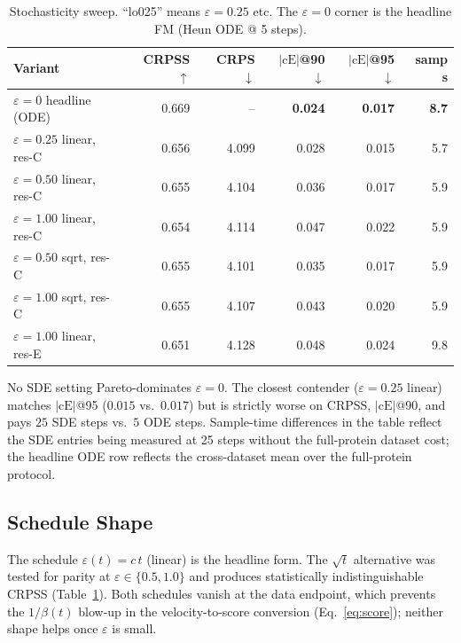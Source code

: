 \documentclass{uai2026}
\begin{document}
\begin{table}[!h]
  \centering
  \caption{Stochasticity sweep. ``lo025'' means $\varepsilon=0.25$ etc. The $\varepsilon=0$ corner is the headline FM (Heun ODE @ 5 steps).}\label{tab:stoch-eps}
  \footnotesize
  \begin{tabular}{lrrrrr}
    \toprule
    Variant & CRPSS $\uparrow$ & CRPS $\downarrow$ & $|\text{cE}|$@90 $\downarrow$ & $|\text{cE}|$@95 $\downarrow$ & samp s \\
    \midrule
    $\varepsilon=0$ headline (ODE)    & 0.669 & --     & \textbf{0.024} & \textbf{0.017} & \textbf{8.7} \\
    $\varepsilon=0.25$ linear, res-C  & 0.656 & 4.099  & 0.028 & 0.015 & 5.7 \\
    $\varepsilon=0.50$ linear, res-C  & 0.655 & 4.104  & 0.036 & 0.017 & 5.9 \\
    $\varepsilon=1.00$ linear, res-C  & 0.654 & 4.114  & 0.047 & 0.022 & 5.9 \\
    $\varepsilon=0.50$ sqrt, res-C    & 0.655 & 4.101  & 0.035 & 0.017 & 5.9 \\
    $\varepsilon=1.00$ sqrt, res-C    & 0.655 & 4.107  & 0.043 & 0.020 & 5.9 \\
    $\varepsilon=1.00$ linear, res-E  & 0.651 & 4.128  & 0.048 & 0.024 & 9.8 \\
    \bottomrule
  \end{tabular}
\end{table}

No SDE setting Pareto-dominates $\varepsilon=0$. The closest contender ($\varepsilon=0.25$ linear) matches $|\text{cE}|$@95 ($0.015$ vs.\ $0.017$) but is strictly worse on CRPSS, $|\text{cE}|$@90, and pays $25$ SDE steps vs.\ $5$ ODE steps. Sample-time differences in the table reflect the SDE entries being measured at 25 steps without the full-protein dataset cost; the headline ODE row reflects the cross-dataset mean over the full-protein protocol.

\subsection{Schedule Shape}\label{app:stoch-schedule}

The schedule $\varepsilon(t) = c\,t$ (linear) is the headline form. The $\sqrt{t}$ alternative was tested for parity at $\varepsilon \in \{0.5, 1.0\}$ and produces statistically indistinguishable CRPSS (Table~\ref{tab:stoch-eps}). Both schedules vanish at the data endpoint, which prevents the $1/\beta(t)$ blow-up in the velocity-to-score conversion (Eq.~\eqref{eq:score}); neither shape helps once $\varepsilon$ is small.
\end{document}

